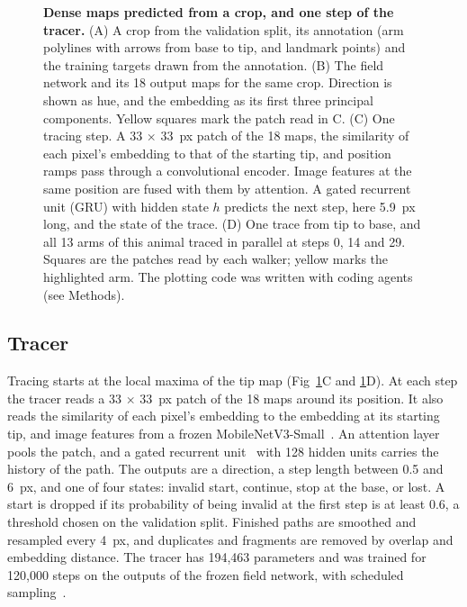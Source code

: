 \begin{figure}[!ht]
\caption{{\bf Dense maps predicted from a crop, and one step of the tracer.}
(A) A crop from the validation split, its annotation (arm polylines with arrows from base to tip, and landmark points) and the training targets drawn from the annotation.
(B) The field network and its 18 output maps for the same crop. Direction is shown as hue, and the embedding as its first three principal components. Yellow squares mark the patch read in C.
(C) One tracing step. A 33 $\times$ 33~px patch of the 18 maps, the similarity of each pixel's embedding to that of the starting tip, and position ramps pass through a convolutional encoder. Image features at the same position are fused with them by attention. A gated recurrent unit (GRU) with hidden state $h$ predicts the next step, here 5.9~px long, and the state of the trace.
(D) One trace from tip to base, and all 13 arms of this animal traced in parallel at steps 0, 14 and 29. Squares are the patches read by each walker; yellow marks the highlighted arm. The plotting code was written with coding agents (see Methods).}
\label{fig:fields}
\end{figure}

\subsection*{Tracer}

Tracing starts at the local maxima of the tip map (Fig~\ref{fig:fields}C and \ref{fig:fields}D).
At each step the tracer reads a 33 $\times$ 33~px patch of the 18 maps around its position.
It also reads the similarity of each pixel's embedding to the embedding at its starting tip, and image features from a frozen MobileNetV3-Small~\cite{howard2019searching}.
An attention layer pools the patch, and a gated recurrent unit~\cite{cho2014learning} with 128 hidden units carries the history of the path.
The outputs are a direction, a step length between 0.5 and 6~px, and one of four states: invalid start, continue, stop at the base, or lost.
A start is dropped if its probability of being invalid at the first step is at least 0.6, a threshold chosen on the validation split.
Finished paths are smoothed and resampled every 4~px, and duplicates and fragments are removed by overlap and embedding distance.
The tracer has 194,463 parameters and was trained for 120,000 steps on the outputs of the frozen field network, with scheduled sampling~\cite{bengio2015scheduled}.

